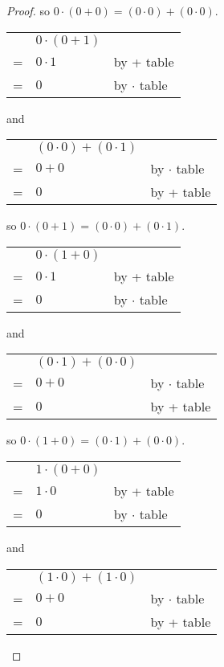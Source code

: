 \documentclass[14pt]{extarticle}
\newcommand{\cy}{\color{cyan}}
\begin{document}
\begin{proof}
  so \(0 \cdot (0 + 0) = (0 \cdot 0) + (0 \cdot 0)\).

  \begin{tabular}{cll}
      & \(0 \cdot (0 + 1)\) &                        \\
    = & \(0 \cdot 1\)       & {\cy by + table}       \\
    = & \(0\)               & {\cy by $\cdot$ table}
  \end{tabular}
  and
  \begin{tabular}{cll}
      & \((0 \cdot 0) + (0 \cdot 1)\) &                        \\
    = & \(0 + 0\)                     & {\cy by $\cdot$ table} \\
    = & \(0\)                         & {\cy by + table}
  \end{tabular}

  so \(0 \cdot (0 + 1) = (0 \cdot 0) + (0 \cdot 1)\).

  \begin{tabular}{cll}
      & \(0 \cdot (1 + 0)\) &                        \\
    = & \(0 \cdot 1\)       & {\cy by + table}       \\
    = & \(0\)               & {\cy by $\cdot$ table}
  \end{tabular}
  and
  \begin{tabular}{cll}
      & \((0 \cdot 1) + (0 \cdot 0)\) &                        \\
    = & \(0 + 0\)                     & {\cy by $\cdot$ table} \\
    = & \(0\)                         & {\cy by + table}
  \end{tabular}

  so \(0 \cdot (1 + 0) = (0 \cdot 1) + (0 \cdot 0)\).

  \begin{tabular}{cll}
      & \(1 \cdot (0 + 0)\) &                        \\
    = & \(1 \cdot 0\)       & {\cy by + table}       \\
    = & \(0\)               & {\cy by $\cdot$ table}
  \end{tabular}
  and
  \begin{tabular}{cll}
      & \((1 \cdot 0) + (1 \cdot 0)\) &                        \\
    = & \(0 + 0\)                     & {\cy by $\cdot$ table} \\
    = & \(0\)                         & {\cy by + table}
  \end{tabular}


\end{proof}
\end{document}

